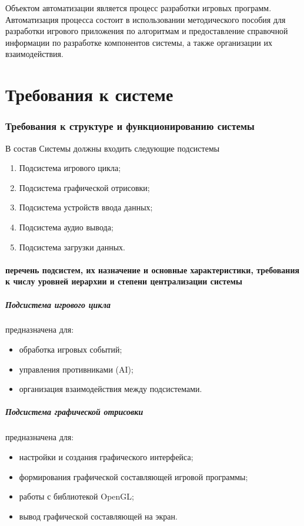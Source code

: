 Объектом автоматизации является процесс разработки игровых программ. Автоматизация процесса состоит в 
использовании методического пособия для разработки игрового приложения по алгоритмам и предоставление 
справочной информации по разработке компонентов системы, а также организации их взаимодействия.


\chapter{Требования к системе}

\subsection{Требования к структуре и функционированию системы}
В состав Системы должны входить следующие подсистемы
\begin{enumerate}
    \item Подсистема игрового цикла;
    \item Подсистема графической отрисовки;
    \item Подсистема устройств ввода данных;
    \item Подсистема аудио вывода;
    \item Подсистема загрузки данных.
\end{enumerate}

\subsubsection{перечень подсистем, их назначение и основные характеристики, требования к числу 
    уровней иерархии и степени централизации системы}
\paragraph{Подсистема игрового цикла}
предназначена для:
\begin{itemize}
    \item обработка игровых событий;
    \item управления противниками (AI);
    \item организация взаимодействия между подсистемами.
\end{itemize}

\paragraph{Подсистема графической отрисовки}
предназначена для:
\begin{itemize}
    \item настройки и создания графического интерфейса;
    \item формирования графической составляющей игровой программы;
    \item работы с библиотекой OpenGL;
    \item вывод графической составляющей на экран.
\end{itemize}

